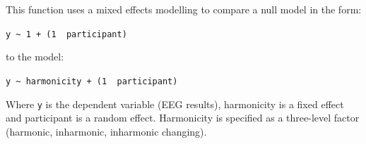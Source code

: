 \documentclass[
]{article}
\newenvironment{Shaded}{\begin{snugshade}}{\end{snugshade}}
\newcommand{\AttributeTok}[1]{\textcolor[rgb]{0.77,0.63,0.00}{#1}}
\newcommand{\CommentTok}[1]{\textcolor[rgb]{0.56,0.35,0.01}{\textit{#1}}}
\newcommand{\DecValTok}[1]{\textcolor[rgb]{0.00,0.00,0.81}{#1}}
\newcommand{\FunctionTok}[1]{\textcolor[rgb]{0.00,0.00,0.00}{#1}}
\newcommand{\NormalTok}[1]{#1}
\newcommand{\OtherTok}[1]{\textcolor[rgb]{0.56,0.35,0.01}{#1}}
\newcommand{\SpecialCharTok}[1]{\textcolor[rgb]{0.00,0.00,0.00}{#1}}
\newcommand{\StringTok}[1]{\textcolor[rgb]{0.31,0.60,0.02}{#1}}
\begin{document}
\begin{Shaded}
\end{Shaded}

This function uses a mixed effects modelling to compare a null model in
the form:

\texttt{y\ \textasciitilde{}\ 1\ +\ (1\ \textbar{}\ participant)}

to the model:

\texttt{y\ \textasciitilde{}\ harmonicity\ +\ (1\ \textbar{}\ participant)}

Where \texttt{y} is the dependent variable (EEG results), harmonicity is
a fixed effect and participant is a random effect. Harmonicity is
specified as a three-level factor (harmonic, inharmonic, inharmonic
changing).
\end{document}
